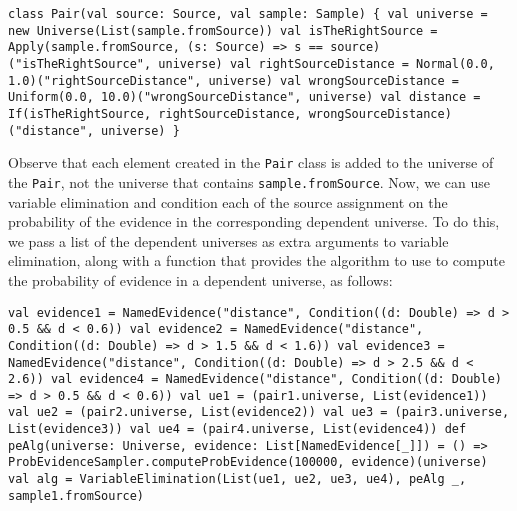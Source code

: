 \begin{flushleft}
\texttt{class Pair(val source: Source, val sample: Sample) \{ 
\newline \tab val universe = new Universe(List(sample.fromSource)) 
\newline \tab val isTheRightSource =
\newline \tab Apply(sample.fromSource, (s: Source) => s == source)("isTheRightSource", universe)
\newline \tab val rightSourceDistance = Normal(0.0, 1.0)("rightSourceDistance", universe)
\newline \tab val wrongSourceDistance = Uniform(0.0, 10.0)("wrongSourceDistance", universe)
\newline \tab val distance =
\newline \tab If(isTheRightSource, rightSourceDistance, wrongSourceDistance)("distance", universe)
\newline \} }
\end{flushleft}

Observe that each element created in the \texttt{Pair} class is added to the universe of the \texttt{Pair}, not the universe that contains \texttt{sample.fromSource}. Now, we can use variable elimination and condition each of the source assignment on the probability of the evidence in the corresponding dependent universe. To do this, we pass a list of the dependent universes as extra arguments to variable elimination, along
with a function that provides the algorithm to use to compute the probability of evidence in a dependent universe, as follows:

\begin{flushleft}
\texttt{val evidence1 = NamedEvidence("distance", Condition((d: Double) => d > 0.5 \&\& d < 0.6))
\newline val evidence2 = NamedEvidence("distance", Condition((d: Double) => d > 1.5 \&\& d < 1.6))
\newline val evidence3 = NamedEvidence("distance", Condition((d: Double) => d > 2.5 \&\& d < 2.6))
\newline val evidence4 = NamedEvidence("distance", Condition((d: Double) => d > 0.5 \&\& d < 0.6))
\newline val ue1 = (pair1.universe, List(evidence1))
\newline val ue2 = (pair2.universe, List(evidence2))
\newline val ue3 = (pair3.universe, List(evidence3))
\newline val ue4 = (pair4.universe, List(evidence4))
\newline def peAlg(universe: Universe, evidence: List[NamedEvidence[\_]]) = () => 
\newline ProbEvidenceSampler.computeProbEvidence(100000, evidence)(universe)
\newline val alg = VariableElimination(List(ue1, ue2, ue3, ue4), peAlg \_, sample1.fromSource)}
\end{flushleft}


